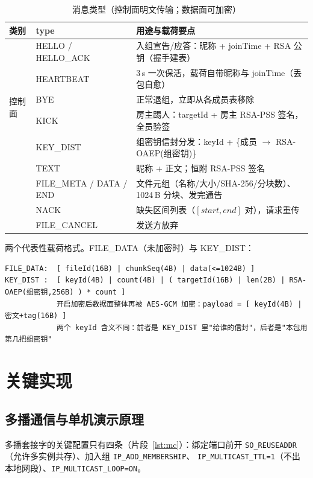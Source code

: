 \documentclass[11pt,a4paper,fontset=fandol]{ctexart}
\begin{document}
\begin{table}[H]
\centering\footnotesize
\begin{tabularx}{0.98\textwidth}{llX}
\toprule
类别 & type & 用途与载荷要点 \\
\midrule
\multirow{6}{*}{控制面} & HELLO / HELLO\_ACK & 入组宣告/应答：昵称 + joinTime + RSA 公钥（握手建表） \\
 & HEARTBEAT & 3\,s 一次保活，载荷自带昵称与 joinTime（丢包自愈） \\
 & BYE & 正常退组，立即从各成员表移除 \\
 & KICK & 房主踢人：targetId + 房主 RSA-PSS 签名，全员验签 \\
 & KEY\_DIST & 组密钥信封分发：keyId + \{成员 $\to$ RSA-OAEP(组密钥)\} \\
\midrule
\multirow{5}{*}{数据面} & TEXT & 昵称 + 正文；恒附 RSA-PSS 签名 \\
 & FILE\_META / DATA / END & 文件元组（名称/大小/SHA-256/分块数）、1024\,B 分块、发完通告 \\
 & NACK & 缺失区间列表（$[start,end]$ 对），请求重传 \\
 & FILE\_CANCEL & 发送方放弃 \\
\bottomrule
\end{tabularx}
\caption{消息类型（控制面明文传输；数据面可加密）}
\label{tab:types}
\end{table}

\noindent 两个代表性载荷格式。FILE\_DATA（未加密时）与 KEY\_DIST：

\begin{lstlisting}[caption={数据面与密钥分发的载荷布局}]
FILE_DATA:  [ fileId(16B) | chunkSeq(4B) | data(<=1024B) ]
KEY_DIST :  [ keyId(4B) | count(4B) | ( targetId(16B) | len(2B) | RSA-OAEP(组密钥,256B) ) * count ]
            开启加密后数据面整体再被 AES-GCM 加密：payload = [ keyId(4B) | 密文+tag(16B) ]
            两个 keyId 含义不同：前者是 KEY_DIST 里"给谁的信封"，后者是"本包用第几把组密钥"
\end{lstlisting}

\section{关键实现}

\subsection{多播通信与单机演示原理}

多播套接字的关键配置只有四条（片段~\ref{lst:mc}）：绑定端口前开
\texttt{SO\_REUSEADDR}（允许多实例共存）、加入组 \texttt{IP\_ADD\_MEMBERSHIP}、
\texttt{IP\_MULTICAST\_TTL=1}（不出本地网段）、\texttt{IP\_MULTICAST\_LOOP=ON}。
\end{document}
